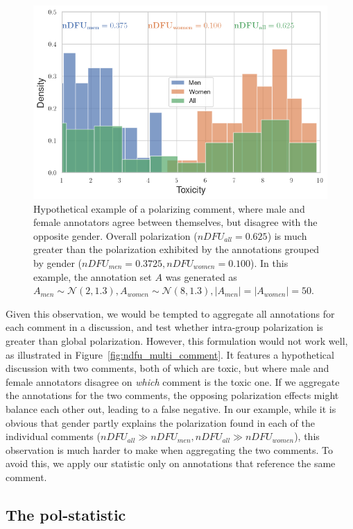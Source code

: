 \documentclass{article}
\begin{document}
\begin{figure}
	\centering
	\includegraphics[width=0.8\linewidth]{ndfu_single_comment.png}
	\caption{Hypothetical example of a polarizing comment, where male and female annotators agree between themselves, but disagree with the opposite gender. Overall polarization ($nDFU_{all} = 0.625$) is much greater than the polarization exhibited by the annotations grouped by gender ($nDFU_{men} = 0.3725, nDFU_{women} = 0.100$). In this example, the annotation set $A$ was generated as $A_{men} \sim \mathcal{N}(2, 1.3), A_{women} \sim \mathcal{N}(8, 1.3), \lvert A_{men} \rvert = \lvert A_{women} \rvert = 50$.}
	\label{fig:ndfu_single_comment}
\end{figure}

 Given this observation, we would be tempted to aggregate all annotations for each comment in a discussion, and test whether intra-group polarization is greater than global polarization. However, this formulation would not work well, as illustrated in  Figure~\ref{fig:ndfu_multi_comment}. It features a hypothetical discussion with two comments, both of which are toxic, but where male and female annotators disagree on \emph{which} comment is the toxic one. If we aggregate the annotations for the two comments, the opposing polarization effects might balance each other out, leading to a false negative. In our example, while it is obvious that gender partly explains the polarization found in each of the individual comments ($nDFU_{all} \gg nDFU_{men}, nDFU_{all} \gg nDFU_{women}$), this observation is much harder to make when aggregating the two comments. To avoid this, we apply our statistic only on annotations that reference the same comment. 
 
 
 \subsection{The pol-statistic}
 \label{ssec:methodology:polstat}
  
\end{document}
